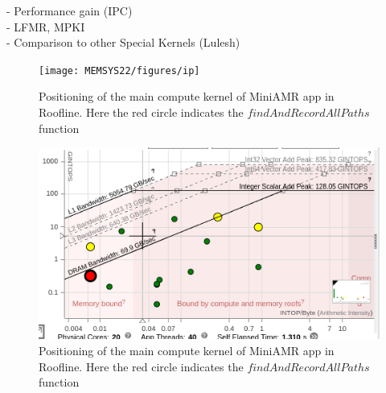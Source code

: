 -	Performance gain (IPC) \\
-	LFMR, MPKI \\
-	Comparison to other Special Kernels (Lulesh)


\begin{figure}[h]%
\begin{center}
\texttt{[image: MEMSYS22/figures/ip]}
\end{center}
  \vspace{-0.1in}
\caption{Positioning of the main compute kernel of MiniAMR app in Roofline. Here the red circle indicates the $findAndRecordAllPaths$ function }
\label{fig:roof-pathfinder}
\vspace{-0.2in}
\end{figure}

\begin{figure}[h]%
\begin{center}
\includegraphics[width=1\linewidth]{MEMSYS22/figures/roofline/pathfinder.png}
\end{center}
  \vspace{-0.1in}
\caption{Positioning of the main compute kernel of MiniAMR app in Roofline. Here the red circle indicates the $findAndRecordAllPaths$ function }
\label{fig:roof-pathfinder}
\vspace{-0.2in}
\end{figure}

